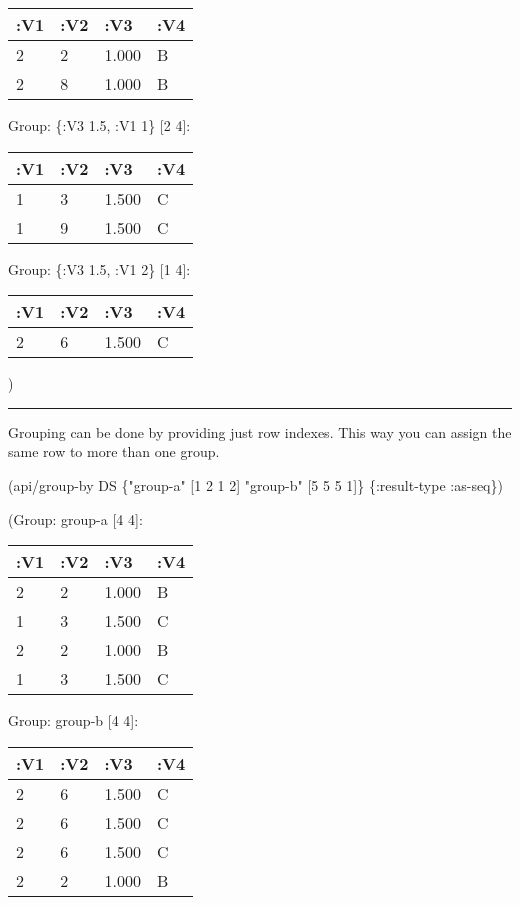 \documentclass[]{article}
\newenvironment{Shaded}{\begin{snugshade}}{\end{snugshade}}
\newcommand{\DecValTok}[1]{\textcolor[rgb]{0.00,0.00,0.81}{#1}}
\newcommand{\StringTok}[1]{\textcolor[rgb]{0.31,0.60,0.02}{#1}}
\newcommand{\AttributeTok}[1]{\textcolor[rgb]{0.77,0.63,0.00}{#1}}
\newcommand{\NormalTok}[1]{#1}
\begin{document}
\begin{longtable}[]{@{}llll@{}}
\toprule
:V1 & :V2 & :V3 & :V4\tabularnewline
\midrule
\endhead
2 & 2 & 1.000 & B\tabularnewline
2 & 8 & 1.000 & B\tabularnewline
\bottomrule
\end{longtable}

Group: \{:V3 1.5, :V1 1\} {[}2 4{]}:

\begin{longtable}[]{@{}llll@{}}
\toprule
:V1 & :V2 & :V3 & :V4\tabularnewline
\midrule
\endhead
1 & 3 & 1.500 & C\tabularnewline
1 & 9 & 1.500 & C\tabularnewline
\bottomrule
\end{longtable}

Group: \{:V3 1.5, :V1 2\} {[}1 4{]}:

\begin{longtable}[]{@{}llll@{}}
\toprule
:V1 & :V2 & :V3 & :V4\tabularnewline
\midrule
\endhead
2 & 6 & 1.500 & C\tabularnewline
\bottomrule
\end{longtable}

)

\begin{center}\rule{0.5\linewidth}{0.5pt}\end{center}

Grouping can be done by providing just row indexes. This way you can
assign the same row to more than one group.

\begin{Shaded}
\begin{Highlighting}[]
\NormalTok{(api/group-by DS \{}\StringTok{"group-a"}\NormalTok{ [}\DecValTok{1} \DecValTok{2} \DecValTok{1} \DecValTok{2}\NormalTok{]}
                  \StringTok{"group-b"}\NormalTok{ [}\DecValTok{5} \DecValTok{5} \DecValTok{5} \DecValTok{1}\NormalTok{]\} \{}\AttributeTok{:result-type} \AttributeTok{:as-seq}\NormalTok{\})}
\end{Highlighting}
\end{Shaded}

(Group: group-a {[}4 4{]}:

\begin{longtable}[]{@{}llll@{}}
\toprule
:V1 & :V2 & :V3 & :V4\tabularnewline
\midrule
\endhead
2 & 2 & 1.000 & B\tabularnewline
1 & 3 & 1.500 & C\tabularnewline
2 & 2 & 1.000 & B\tabularnewline
1 & 3 & 1.500 & C\tabularnewline
\bottomrule
\end{longtable}

Group: group-b {[}4 4{]}:

\begin{longtable}[]{@{}llll@{}}
\toprule
:V1 & :V2 & :V3 & :V4\tabularnewline
\midrule
\endhead
2 & 6 & 1.500 & C\tabularnewline
2 & 6 & 1.500 & C\tabularnewline
2 & 6 & 1.500 & C\tabularnewline
2 & 2 & 1.000 & B\tabularnewline
\bottomrule
\end{longtable}
\end{document}
